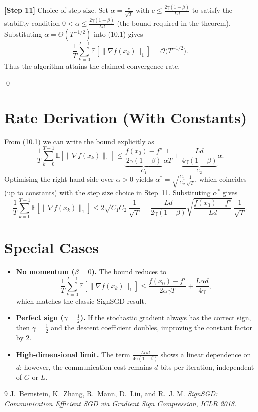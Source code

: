\documentclass[11pt]{article}
\newcommand{\E}{\mathbb{E}}
\begin{document}
\noindent\textbf{[Step 11]} Choice of step size.  
Set $\alpha = \frac{c}{\sqrt{T}}$ with $c\le \frac{2\gamma(1-\beta)}{Ld}$ to satisfy the stability condition $0<\alpha\le\frac{2\gamma(1-\beta)}{Ld}$ (the bound required in the theorem). Substituting $\alpha = \Theta(T^{-1/2})$ into (10.1) gives
\[
\frac{1}{T}\sum_{k=0}^{T-1}\E[\|\nabla f(x_k)\|_{1}]
 = \mathcal{O}\!\big(T^{-1/2}\big).
\]
Thus the algorithm attains the claimed convergence rate.

\qed

\section{Rate Derivation (With Constants)}
From (10.1) we can write the bound explicitly as
\[
\frac{1}{T}\sum_{k=0}^{T-1}\E[\|\nabla f(x_k)\|_{1}]
\le
\underbrace{\frac{f(x_0)-f^{\star}}{2\gamma(1-\beta)}}_{\displaystyle C_1}
\frac{1}{\alpha T}
+
\underbrace{\frac{L d}{4\gamma(1-\beta)}}_{\displaystyle C_2}\alpha .
\]
Optimising the right‑hand side over $\alpha>0$ yields $\alpha^{*}= \sqrt{\frac{C_1}{C_2}}\frac{1}{\sqrt{T}}$, which coincides (up to constants) with the step size choice in Step~11. Substituting $\alpha^{*}$ gives
\[
\frac{1}{T}\sum_{k=0}^{T-1}\E[\|\nabla f(x_k)\|_{1}]
\le
2\sqrt{C_1 C_2}\,\frac{1}{\sqrt{T}}
=
\frac{L d}{2\gamma(1-\beta)}\sqrt{\frac{f(x_0)-f^{\star}}{L d}}\,\frac{1}{\sqrt{T}}.
\]

\section{Special Cases}
\begin{itemize}
    \item \textbf{No momentum ($\beta=0$).} The bound reduces to
    \[
    \frac{1}{T}\sum_{k=0}^{T-1}\E[\|\nabla f(x_k)\|_{1}]
    \le
    \frac{f(x_0)-f^{\star}}{2\alpha\gamma T}
    +\frac{L\alpha d}{4\gamma},
    \]
    which matches the classic SignSGD result.
    \item \textbf{Perfect sign ($\gamma=\tfrac12$).} If the stochastic gradient always has the correct sign, then $\gamma=\tfrac12$ and the descent coefficient doubles, improving the constant factor by $2$.
    \item \textbf{High‑dimensional limit.} The term $\frac{L\alpha d}{4\gamma(1-\beta)}$ shows a linear dependence on $d$; however, the communication cost remains $d$ bits per iteration, independent of $G$ or $L$.
\end{itemize}

\newpage
\begin{thebibliography}{9}
J.~Bernstein, K.~Zhang, R.~Mann, D.~Liu, and R.~J. M. \emph{SignSGD: 
  Communication Efficient SGD via Gradient Sign Compression}, 
  \emph{ICLR 2018}.
\end{thebibliography}
\end{document}
